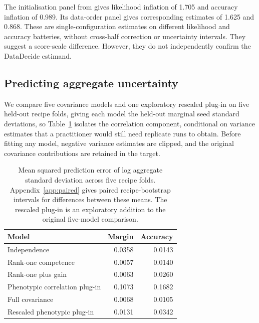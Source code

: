 \documentclass{article}
\begin{document}
The initialisation panel from \citet{heineman2025} gives likelihood inflation of 1.705 and accuracy inflation of 0.989. Its data-order panel gives corresponding estimates of 1.625 and 0.868. These are single-configuration estimates on different likelihood and accuracy batteries, without cross-half correction or uncertainty intervals. They suggest a score-scale difference. However, they do not independently confirm the DataDecide estimand.

\subsection{Predicting aggregate uncertainty}
We compare five covariance models and one exploratory rescaled plug-in on five held-out recipe folds, giving each model the held-out marginal seed standard deviations, so Table~\ref{tab:prediction} isolates the correlation component, conditional on variance estimates that a practitioner would still need replicate runs to obtain. Before fitting any model, negative variance estimates are clipped, and the original covariance contributions are retained in the target.

\begin{table}[!htb]
\centering
\caption{Mean squared prediction error of log aggregate standard deviation across five recipe folds. Appendix~\ref{app:paired} gives paired recipe-bootstrap intervals for differences between these means. The rescaled plug-in is an exploratory addition to the original five-model comparison.}
\label{tab:prediction}
\small\setlength{\tabcolsep}{4pt}\renewcommand{\arraystretch}{1.12}
\begin{tabular}{lrr}
\toprule
Model & Margin & Accuracy\\
\midrule
Independence & 0.0358 & 0.0143\\
Rank-one competence & 0.0057 & 0.0140\\
Rank-one plus gain & 0.0063 & 0.0260\\
Phenotypic correlation plug-in & 0.1073 & 0.1682\\
Full covariance & 0.0068 & 0.0105\\
Rescaled phenotypic plug-in & 0.0131 & 0.0342\\
\bottomrule
\end{tabular}
\end{table}
\end{document}
